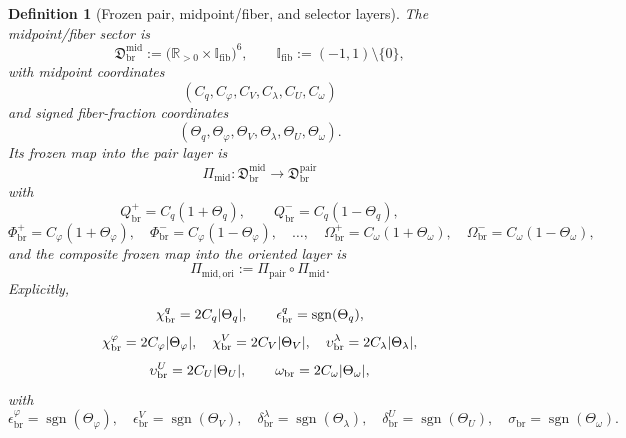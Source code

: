 \documentclass[11pt]{article}
\newcommand{\AbsReadAmp}{\chi_{\mathrm{br}}^{q}}
\newcommand{\AbsCovAmp}{\chi_{\mathrm{br}}^{\varphi}}
\newcommand{\AbsRelaxAmp}{\chi_{\mathrm{br}}^{V}}
\newcommand{\AbsWellAmp}{\upsilon_{\mathrm{br}}^{\lambda}}
\newcommand{\AbsEqAmp}{\upsilon_{\mathrm{br}}^{U}}
\newcommand{\AbsScaleAmp}{\omega_{\mathrm{br}}}
\newcommand{\PolRead}{\epsilon_{\mathrm{br}}^{q}}
\newcommand{\PolCov}{\epsilon_{\mathrm{br}}^{\varphi}}
\newcommand{\PolRelax}{\epsilon_{\mathrm{br}}^{V}}
\newcommand{\PolWell}{\delta_{\mathrm{br}}^{\lambda}}
\newcommand{\PolEq}{\delta_{\mathrm{br}}^{U}}
\newcommand{\PolScale}{\sigma_{\mathrm{br}}}
\newcommand{\PairSector}{\mathfrak D_{\mathrm{br}}^{\mathrm{pair}}}
\newcommand{\PairMap}{\Pi_{\mathrm{pair}}}
\newcommand{\PairReadPlus}{Q_{\mathrm{br}}^{+}}
\newcommand{\PairReadMinus}{Q_{\mathrm{br}}^{-}}
\newcommand{\PairCovPlus}{\Phi_{\mathrm{br}}^{+}}
\newcommand{\PairCovMinus}{\Phi_{\mathrm{br}}^{-}}
\newcommand{\PairScalePlus}{\Omega_{\mathrm{br}}^{+}}
\newcommand{\PairScaleMinus}{\Omega_{\mathrm{br}}^{-}}
\newcommand{\MidFiberSector}{\mathfrak D_{\mathrm{br}}^{\mathrm{mid}}}
\newcommand{\MidPairMap}{\Pi_{\mathrm{mid}}}
\newcommand{\MidOriginMap}{\Pi_{\mathrm{mid,ori}}}
\newcommand{\MidRead}{C_{q}}
\newcommand{\MidCov}{C_{\varphi}}
\newcommand{\MidRelax}{C_{V}}
\newcommand{\MidWell}{C_{\lambda}}
\newcommand{\MidEq}{C_{U}}
\newcommand{\MidScale}{C_{\omega}}
\newcommand{\FiberRead}{\Theta_{q}}
\newcommand{\FiberCov}{\Theta_{\varphi}}
\newcommand{\FiberRelax}{\Theta_{V}}
\newcommand{\FiberWell}{\Theta_{\lambda}}
\newcommand{\FiberEq}{\Theta_{U}}
\newcommand{\FiberScale}{\Theta_{\omega}}
\newcommand{\FiberDom}{\mathbb I_{\mathrm{fib}}}
\newtheorem{definition}{Definition}
\begin{document}
\begin{definition}[Frozen pair, midpoint/fiber, and selector layers]
The midpoint/fiber sector is
\begin{equation}
\MidFiberSector
:=
\bigl(\mathbb R_{>0}\times\FiberDom\bigr)^{6},
\qquad
\FiberDom:=(-1,1)\setminus\{0\},
\label{eq:midsector}
\end{equation}
with midpoint coordinates
\begin{equation}
(\MidRead,\MidCov,\MidRelax,\MidWell,\MidEq,\MidScale)
\label{eq:midcoords}
\end{equation}
and signed fiber-fraction coordinates
\begin{equation}
(\FiberRead,\FiberCov,\FiberRelax,\FiberWell,\FiberEq,\FiberScale).
\label{eq:fibercoords}
\end{equation}
Its frozen map into the pair layer is
\begin{equation}
\MidPairMap:\MidFiberSector\longrightarrow\PairSector
\label{eq:midpairmap}
\end{equation}
with
\begin{equation}
\PairReadPlus=\MidRead(1+\FiberRead),
\qquad
\PairReadMinus=\MidRead(1-\FiberRead),
\label{eq:midpairsA}
\end{equation}
\begin{equation}
\PairCovPlus=\MidCov(1+\FiberCov),
\quad
\PairCovMinus=\MidCov(1-\FiberCov),
\quad
\ldots,
\quad
\PairScalePlus=\MidScale(1+\FiberScale),
\quad
\PairScaleMinus=\MidScale(1-\FiberScale),
\label{eq:midpairsB}
\end{equation}
and the composite frozen map into the oriented layer is
\begin{equation}
\MidOriginMap:=\PairMap\circ\MidPairMap.
\label{eq:midorigin}
\end{equation}
Explicitly,
\begin{equation}
\AbsReadAmp=2\MidRead\abs{\FiberRead},
\qquad
\PolRead=\operatorname{sgn}(\FiberRead),
\label{eq:midoriginA}
\end{equation}
\begin{equation}
\AbsCovAmp=2\MidCov\abs{\FiberCov},
\quad
\AbsRelaxAmp=2\MidRelax\abs{\FiberRelax},
\quad
\AbsWellAmp=2\MidWell\abs{\FiberWell},
\label{eq:midoriginB}
\end{equation}
\begin{equation}
\AbsEqAmp=2\MidEq\abs{\FiberEq},
\qquad
\AbsScaleAmp=2\MidScale\abs{\FiberScale},
\label{eq:midoriginC}
\end{equation}
with
\begin{equation}
\PolCov=\operatorname{sgn}(\FiberCov),
\quad
\PolRelax=\operatorname{sgn}(\FiberRelax),
\quad
\PolWell=\operatorname{sgn}(\FiberWell),
\quad
\PolEq=\operatorname{sgn}(\FiberEq),
\quad
\PolScale=\operatorname{sgn}(\FiberScale).
\label{eq:midoriginD}
\end{equation}


\end{definition}
\end{document}
